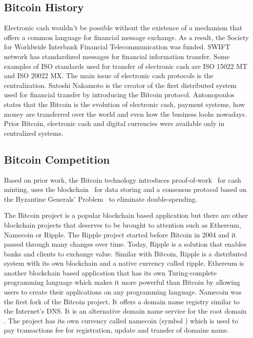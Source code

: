 \subsection{Bitcoin History}
\label{subsec:history-lbl}
Electronic cash wouldn’t be possible without the existence of a mechanism that offers a common language for financial message exchange. As a result, the Society for Worldwide Interbank Financial Telecommunication was funded. SWIFT network has standardized messages for financial information transfer. Some examples of ISO standards used for transfer of electronic cash are ISO 15022 MT and ISO 20022 MX.
The main issue of electronic cash protocols is the centralization. Satoshi Nakamoto is the creator of the first distributed system used for financial transfer by introducing the Bitcoin protocol.
Antonopoulos~\cite{masterbit} states that the Bitcoin is the evolution of electronic cash, payment systems, how money are transferred over the world and even how the business looks nowadays.
Prior Bitcoin, electronic cash and digital currencies were available only in centralized systems.

\subsection{Bitcoin Competition}
\label{subsec:overview-lbl}
Based on prior work, the Bitcoin technology introduces proof-of-work~\cite{proofofwork} for cash minting, uses the blockchain~\cite{blockchain} for data storing and a consensus protocol based on the Byzantine Generals’ Problem~\cite{byzantine} to eliminate double-spending.

The Bitcoin project is a popular blockchain based application but there are other blockchain projects that deserves to be brought to attention such as Ethereum, Namecoin or Ripple.
The Ripple project started before Bitcoin in 2004 and it passed through many changes over time. Today, Ripple is a solution that enables banks and clients to exchange value. Similar with Bitcoin, Ripple is a distributed system with its own blockchain and a native currency called ripple.
Ethereum is another blockchain based application that has its own Turing-complete programming language which makes it more powerful than Bitcoin by allowing users to create their applications on any programming language.
Namecoin was the first fork of the Bitcoin project. It offers a domain name registry similar to the Internet’s DNS. It is an alternative domain name service for the root domain .
The project has its own currency called namecoin (symbol ) which is used to pay transactions fee for registration, update and transfer of domains name.

